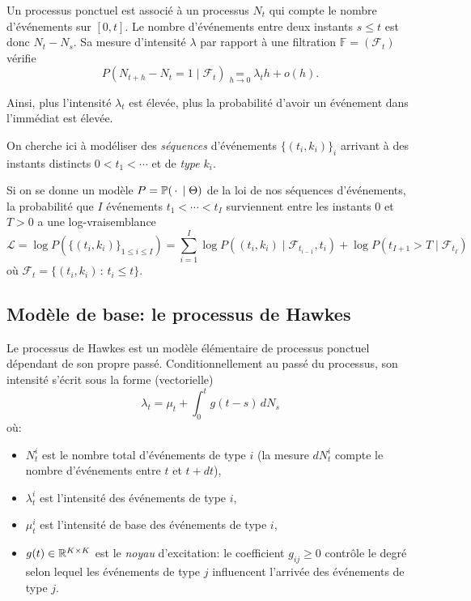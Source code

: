 \documentclass[../main.tex]{subfiles}
\begin{document}
Un processus ponctuel est associé à un processus $N_t$ qui compte le nombre d'événements sur $[0,t]$. Le nombre d'événements entre deux instants $s\leq t$ est donc $N_t - N_s$. Sa mesure d'intensité $\lambda$ par rapport à une filtration $\mathds F = (\mathcal{F}_t)$ vérifie\footnotemark
\[
	P(N_{t+h} - N_t = 1\mid \mathcal{F}_t) \underset{h\to 0}{=} \lambda_th + o(h).
\]

Ainsi, plus l'intensité $\lambda_t$ est élevée, plus la probabilité d'avoir un événement dans l'immédiat est élevée.

On cherche ici à modéliser des \textit{séquences} d'événements ${\{(t_i,k_i)\}}_i$ arrivant à des instants distincts $0<t_1 < \cdots$ et de \textit{type} $k_i$.

Si on se donne un modèle $P = \mathbb{P}(\,\cdot\,\mid \Theta)$ de la loi de nos séquences d'événements, la probabilité que $I$ événements $t_1<\cdots<t_I$ surviennent entre les instants $0$ et $T > 0$ a une log-vraisemblance
\begin{equation}\label{eq:likelihood}
	\mathcal{L} =
	\log P(\{(t_i,k_i)\}_{1\leq i\leq I}) =
	\sum_{i=1}^{I} \log P((t_i,k_i)\mid \mathcal{F}_{t_{i-1}}, t_i)
	+ \log P(t_{I+1}>T\mid \mathcal{F}_{t_{I}})
\end{equation}
où $\mathcal{F}_t = \{ (t_i,k_i)\,:\, t_i \leq t \}$.


\subsection{Modèle de base: le processus de Hawkes}

Le processus de Hawkes est un modèle élémentaire de processus ponctuel dépendant de son propre passé. Conditionnellement au passé du processus, son intensité s'écrit sous la forme (vectorielle)
\begin{equation}
\lambda_t = \mu_t + \int_0^t g(t-s)\,dN_s
\end{equation}
où:\begin{itemize}
	\item $N^i_t$ est le nombre total d'événements de type $i$ (la mesure $dN^i_t$ compte le nombre d'événements entre $t$ et $t+dt$),
	\item $\lambda_t^i$ est l'intensité des événements de type $i$,
	\item $\mu^i_t$ est l'intensité de base des événements de type $i$,
	\item $g(t) \in \mathbb{R}^{K\times K}$ est le \textit{noyau} d'excitation: le coefficient $g_{ij} \geq 0$ contrôle le degré selon lequel les événements de type $j$ influencent l'arrivée des événements de type $j$.
\end{itemize} 
\end{document}
